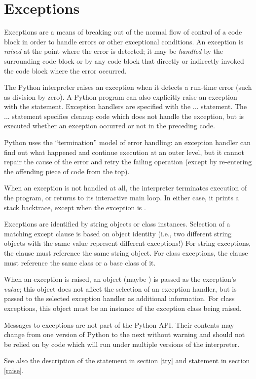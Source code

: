 \section{Exceptions \label{exceptions}}

Exceptions are a means of breaking out of the normal flow of control
of a code block in order to handle errors or other exceptional
conditions.  An exception is
\emph{raised} at the point where the error
is detected; it may be \emph{handled} by
the surrounding code block or by any code block that directly or
indirectly invoked the code block where the error occurred.

The Python interpreter raises an exception when it detects a run-time
error (such as division by zero).  A Python program can also
explicitly raise an exception with the  statement.
Exception handlers are specified with the  ... 
statement.  The  ...  statement
specifies cleanup code which does not handle the exception, but is
executed whether an exception occurred or not in the preceding code.

Python uses the ``termination'' model of
error handling: an exception handler can find out what happened and
continue execution at an outer level, but it cannot repair the cause
of the error and retry the failing operation (except by re-entering
the offending piece of code from the top).

When an exception is not handled at all, the interpreter terminates
execution of the program, or returns to its interactive main loop.  In
either case, it prints a stack backtrace, except when the exception is 
.

Exceptions are identified by string objects or class instances.
Selection of a matching except clause is based on object identity
(i.e., two different string objects with the same value represent
different exceptions!)  For string exceptions, the 
clause must reference the same string object.  For class exceptions,
the  clause must reference the same class or a base
class of it.

When an exception is raised, an object (maybe ) is passed
as the exception's \emph{value}; this object does not affect the
selection of an exception handler, but is passed to the selected
exception handler as additional information.  For class exceptions,
this object must be an instance of the exception class being raised.

\begin{notice}[warning]
Messages to exceptions are not part of the Python API.  Their contents may
change from one version of Python to the next without warning and should not
be relied on by code which will run under multiple versions of the
interpreter.
\end{notice}

See also the description of the  statement in section
\ref{try} and  statement in section \ref{raise}.
